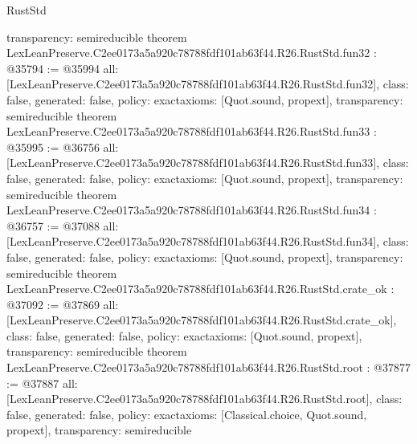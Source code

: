 \begin{lexlean}{RustStd}
\begin{coremodule}
{  transparency: semireducible
}
theorem LexLeanPreserve.C2ee0173a5a920c78788fdf101ab63f44.R26.RustStd.fun32 : @35794 := @35994 {
  all: [LexLeanPreserve.C2ee0173a5a920c78788fdf101ab63f44.R26.RustStd.fun32],
  class: false,
  generated: false,
  policy: exact{axioms: [Quot.sound, propext]},
  transparency: semireducible
}
theorem LexLeanPreserve.C2ee0173a5a920c78788fdf101ab63f44.R26.RustStd.fun33 : @35995 := @36756 {
  all: [LexLeanPreserve.C2ee0173a5a920c78788fdf101ab63f44.R26.RustStd.fun33],
  class: false,
  generated: false,
  policy: exact{axioms: [Quot.sound, propext]},
  transparency: semireducible
}
theorem LexLeanPreserve.C2ee0173a5a920c78788fdf101ab63f44.R26.RustStd.fun34 : @36757 := @37088 {
  all: [LexLeanPreserve.C2ee0173a5a920c78788fdf101ab63f44.R26.RustStd.fun34],
  class: false,
  generated: false,
  policy: exact{axioms: [Quot.sound, propext]},
  transparency: semireducible
}
theorem LexLeanPreserve.C2ee0173a5a920c78788fdf101ab63f44.R26.RustStd.crate_ok : @37092 := @37869 {
  all: [LexLeanPreserve.C2ee0173a5a920c78788fdf101ab63f44.R26.RustStd.crate_ok],
  class: false,
  generated: false,
  policy: exact{axioms: [Quot.sound, propext]},
  transparency: semireducible
}
theorem LexLeanPreserve.C2ee0173a5a920c78788fdf101ab63f44.R26.RustStd.root : @37877 := @37887 {
  all: [LexLeanPreserve.C2ee0173a5a920c78788fdf101ab63f44.R26.RustStd.root],
  class: false,
  generated: false,
  policy: exact{axioms: [Classical.choice, Quot.sound, propext]},
  transparency: semireducible
}


\end{coremodule}
\end{lexlean}
